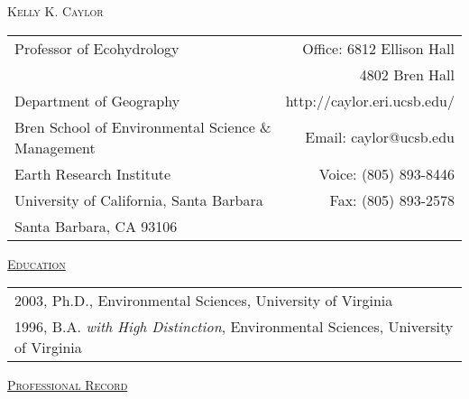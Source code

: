 \documentclass[10pt]{article}
\begin{document}
\begin{center}

\textsc{\large{Kelly K. Caylor}}

\vspace*{.1in}

\begin{tabular*}{.9 \textwidth}{ @{\extracolsep{\fill}} lr}
	Professor of Ecohydrology & Office: 6812 Ellison Hall \\
	& 4802 Bren Hall \\
	Department of Geography & http://caylor.eri.ucsb.edu/ \\
	Bren School of Environmental Science \& Management & Email: caylor@ucsb.edu \\
	Earth Research Institute &  Voice:  (805) 893-8446 \\
	University of California, Santa Barbara  & Fax: (805) 893-2578 \\
	Santa Barbara, CA 93106 & \\
\end{tabular*}

\end{center}


\vspace*{.1in}
\textsc{\underline{Education}}
\vspace*{.1in}

\begin{tabular}{l}
2003, Ph.D., Environmental Sciences, University of Virginia \\
1996, B.A. \emph{with High Distinction}, Environmental Sciences, University of Virginia \\
\end{tabular}

\vspace*{.1in}
\textsc{\underline{Professional Record}}
\vspace*{.1in}
 
\end{document}
